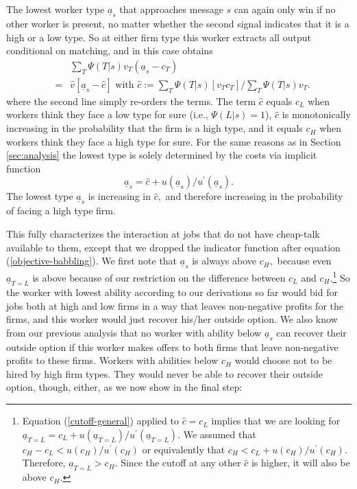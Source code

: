 \documentclass[12pt]{article}
\theoremstyle{plain}
\begin{document}
The lowest worker type $\underline{a}_{s}$ that approaches message $s$ can
again only win if no other worker is present, no matter whether the second
signal indicates that it is a high or a low type. So at either firm type
this worker extracts all output conditional on matching, and in this case
obtains 
\begin{eqnarray*}
&&\sum_{T}\Psi (T|s)v_{T}(\underline{a}_{s}-c_{T}) \\
&=&\widehat{v}[\underline{a}_{s}-\widehat{c}]\text{ with }\widehat{c}%
:=\sum_{T}\Psi (T|s)[v_{T}c_{T}]/\sum_{T}\Psi (T|s)v_{T}.
\end{eqnarray*}%
where the second line simply re-orders the terms. The term $\widehat{c}$
equals $c_{L}$ when workers think they face a low type for sure (i.e., $\Psi
(L|s)=1$), $\widehat{c}$ is monotonically increasing in the probability that
the firm is a high type, and it equals $c_{H}$ when workers think they face
a high type for sure. For the same reasons as in Section \ref{sec:analysis}
the lowest type is solely determined by the costs via implicit function 
\begin{equation}
\underline{a}_{s}=\widehat{c}+u(\underline{a}_{s})/u^{\prime }(\underline{a}%
_{s}).  \label{cutoff-general}
\end{equation}%
The lowest type $\underline{a}_{s}$ is increasing in $\widehat{c},$ and
therefore increasing in the probability of facing a high type firm.

This fully characterizes the interaction at jobs that do not have cheap-talk
available to them, except that we dropped the indicator function after
equation (\ref{objective-babbling}). We first note that $\underline{a}_{s}$
is always above $c_{H},$ because even $\underline{a}_{T=L}$ is above because
of our restriction on the difference between $c_{L}$ and $c_{H}.$\footnote{%
Equation (\ref{cutoff-general}) applied to $\widehat{c}=c_{L}$ implies that
we are looking for $\underline{a}_{T=L}=c_{L}+u(\underline{a}%
_{T=L})/u^{\prime }(\underline{a}_{T=L}).$ We assumed that $%
c_{H}-c_{L}<u(c_{H})/u^{\prime }(c_{H})$ or equivalently that $%
c_{H}<c_{L}+u(c_{H})/u^{\prime }(c_{H}).$ Therefore, $\underline{a}%
_{T=L}>c_{H}.$ Since the cutoff at any other $\widehat{c}$ is higher, it
will also be above $c_{H}.$} So the worker with lowest ability according to
our derivations so far would bid for jobs both at high and low firms in a
way that leaves non-negative profits for the firms, and this worker would
just recover his/her outside option. We also know from our previous analysis
that no worker with ability below $\underline{a}_{s}$ can recover their
outside option if this worker makes offers to both firms that leave
non-negative profits to these firms. Workers with abilities below $c_{H}$
would choose not to be hired by high firm types. They would never be able to
recover their outside option, though, either, as we now show in the final
step:
\end{document}
